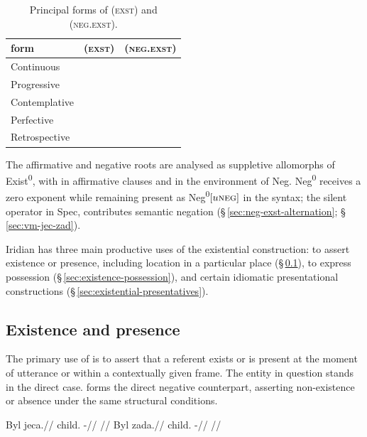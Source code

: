 \begin{table}[ht]
  \footnotesize
  \caption{Principal forms of  (\textsc{exst}) and  (\textsc{neg.exst}).}\label{tab:jec-zad-paradigm}
  \begin{tabularx}{0.88\textwidth}{L l l}
    \toprule
    {\sc form} &  (\textsc{exst}) &  (\textsc{neg.exst}) \\
    \midrule
    Continuous          &    &  \\
    Progressive         &  &  \\
    Contemplative       &  &  \\
    Perfective          &     &  \\
    Retrospective       &    &  \\
    \bottomrule
  \end{tabularx}
\end{table}

The affirmative and negative roots are analysed as suppletive allomorphs of
Exist\textsuperscript{0}, with  in affirmative clauses and
 in the environment of Neg. Neg\textsuperscript{0} receives a zero
exponent while remaining present as Neg\textsuperscript{0}$[u\textsc{neg}]$ in the syntax;
the silent operator in Spec, contributes semantic negation
(§\,\ref{sec:neg-exst-alternation}; §\,\ref{sec:vm-jec-zad}).

Iridian has three main productive uses of the existential construction: to
assert existence or presence, including location in a particular place
(\S\,\ref{sec:existence-and-presence}), to express possession
(\S\,\ref{sec:existence-possession}), and certain idiomatic presentational
constructions (\S\,\ref{sec:existential-presentatives}).


\subsection{Existence and presence}\label{sec:existence-and-presence}

The primary use of  is to assert that a referent exists or is present
at the moment of utterance or within a contextually given frame. The entity in
question stands in the direct case.  forms the direct negative
counterpart, asserting non-existence or absence under the same structural
conditions.

\pex
\a
\begingl
\gla Byl jeca.//
\glb child.\Dir{} \Exst{}-\Cont{}//
\glft {}//
\endgl
\a
\begingl
\gla Byl zada.//
\glb child.\Dir{} \NegExst{}-\Cont{}//
\glft {}//
\endgl
\xe

